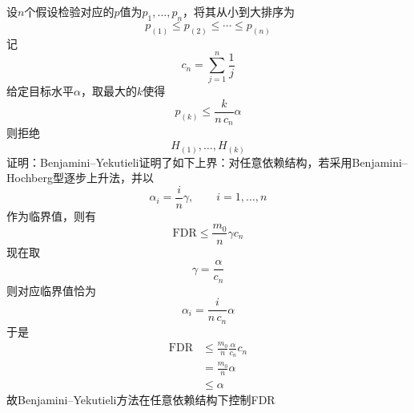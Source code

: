 \begin{method}
	设$n$个假设检验对应的$p$值为$p_1,\dots,p_n$，将其从小到大排序为
	\begin{equation*}
		p_{(1)}\leqslant p_{(2)}\leqslant\cdots\leqslant p_{(n)}
	\end{equation*}
	记
	\begin{equation*}
		c_n=\sum_{j=1}^n\frac1j
	\end{equation*}
	给定目标水平$\alpha$，取最大的$k$使得
	\begin{equation*}
		p_{(k)}\leqslant \frac{k}{n\,c_n}\alpha
	\end{equation*}
	则拒绝
	\begin{equation*}
		H_{(1)},\dots,H_{(k)}
	\end{equation*}
	证明：Benjamini--Yekutieli证明了如下上界：对任意依赖结构，若采用Benjamini--Hochberg型逐步上升法，并以
	\begin{equation*}
		\alpha_i=\frac{i}{n}\gamma,\qquad i=1,\dots,n
	\end{equation*}
	作为临界值，则有
	\begin{equation*}
		\mathrm{FDR}\leqslant \frac{m_0}{n}\gamma c_n
	\end{equation*}
	现在取
	\begin{equation*}
		\gamma=\frac{\alpha}{c_n}
	\end{equation*}
	则对应临界值恰为
	\begin{equation*}
		\alpha_i=\frac{i}{n\,c_n}\alpha
	\end{equation*}
	于是
	\begin{align*}
		\mathrm{FDR}
		&\leqslant \frac{m_0}{n}\frac{\alpha}{c_n}c_n\\
		&=\frac{m_0}{n}\alpha\\
		&\leqslant \alpha
	\end{align*}
	故Benjamini--Yekutieli方法在任意依赖结构下控制FDR
\end{method}